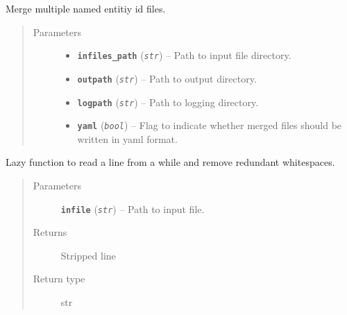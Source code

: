 \documentclass[letterpaper,10pt,english]{sphinxmanual}
\begin{document}

\begin{fulllineitems}
\label{src.prep.nes:src.prep.nes.merge.merge_id_files}
Merge multiple named entitiy id files.
\begin{quote}\begin{description}
\item[{Parameters}] \leavevmode\begin{itemize}
\item {} 
\textbf{\texttt{infiles\_path}} (\emph{\texttt{str}}) -- Path to input file directory.

\item {} 
\textbf{\texttt{outpath}} (\emph{\texttt{str}}) -- Path to output directory.

\item {} 
\textbf{\texttt{logpath}} (\emph{\texttt{str}}) -- Path to logging directory.

\item {} 
\textbf{\texttt{yaml}} (\emph{\texttt{bool}}) -- Flag to indicate whether merged files should be written in yaml format.

\end{itemize}

\end{description}\end{quote}

\end{fulllineitems}


\begin{fulllineitems}
\label{src.prep.nes:src.prep.nes.merge.rl}
Lazy function to read a line from a while and remove redundant whitespaces.
\begin{quote}\begin{description}
\item[{Parameters}] \leavevmode
\textbf{\texttt{infile}} (\emph{\texttt{str}}) -- Path to input file.

\item[{Returns}] \leavevmode
Stripped line

\item[{Return type}] \leavevmode
str

\end{description}\end{quote}

\end{fulllineitems}
\end{document}
